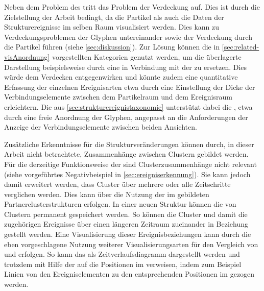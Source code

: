 Neben dem Problem des  tritt das Problem der Verdeckung auf. Dies ist durch die Zielstellung der Arbeit bedingt, da die Partikel als auch die Daten der Strukturereignisse im selben Raum visualisiert werden. Dies kann zu Verdeckungsproblemen der Glyphen untereinander sowie der Verdeckung durch die Partikel führen (siehe \autoref{sec:diskussion}). Zur Lösung können die in \autoref{sec:related-visAnordnung} vorgestellten Kategorien genutzt werden, um die überlagerte Darstellung beispielsweise durch eine  in Verbindung mit der  zu ersetzen. Dies würde dem Verdecken entgegenwirken und könnte zudem eine quantitative Erfassung der einzelnen Ereignisarten etwa durch eine Einstellung der Dicke der Verbindungselemente zwischen dem Partikelraum und dem Ereignisraum erleichtern. Die  aus \autoref{sec:strukturereignistaxonomie} unterstützt dabei die , etwa durch eine freie Anordnung der Glyphen, angepasst an die Anforderungen der Anzeige der Verbindungselemente zwischen beiden Ansichten.

Zusätzliche Erkenntnisse für die Strukturveränderungen können durch, in dieser Arbeit nicht betrachtete, Zusammenhänge zwischen Clustern gebildet werden. Für die derzeitige Funktionsweise der  sind Clusterzusammenhänge nicht relevant (siehe vorgeführtes Negativbeispiel in \autoref{sec:ereigniserkennung}). Sie kann jedoch damit erweitert werden, dass Cluster über mehrere oder alle Zeitschritte verglichen werden. Dies kann über die Nutzung der im \SECC gebildeten Partnerclusterstrukturen erfolgen. In einer neuen Struktur können die  von Clustern permanent gespeichert werden. So können die Cluster und damit die zugehörigen Ereignisse über einen längeren Zeitraum zueinander in Beziehung gestellt werden. Eine Visualisierung dieser Ereignisbeziehungen kann durch die eben vorgeschlagene Nutzung weiterer Visualisierungsarten für den Vergleich von  und  erfolgen. So kann das  als Zeitverlaufsdiagramm dargestellt werden und trotzdem mit Hilfe der  auf die Positionen im  verweisen, indem zum Beispiel Linien von den Ereigniselementen zu den entsprechenden Positionen im  gezogen werden.
	
	

